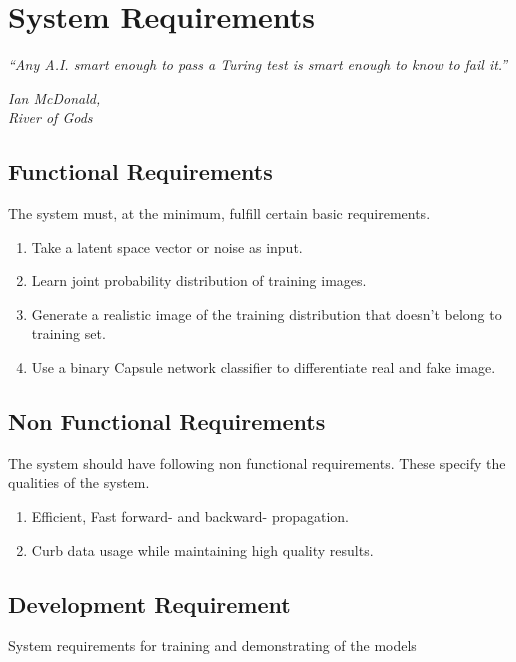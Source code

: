\chapter{System Requirements}\label{ch:system_requirements}
\epigraph{\textit{\normalsize “Any A.I. smart enough to pass a Turing test is smart enough to know to fail it.”}}{\textit{ \normalsize Ian McDonald,\\ River of Gods}}

\section{Functional Requirements} %
\label{sec:functional_requirements}
The system must, at the minimum, fulfill certain basic requirements.
\begin{enumerate}
    \item Take a latent space vector or noise as input.
    \item Learn joint probability distribution of training images.
    \item Generate a realistic image of the training distribution that doesn't belong to training set.
    \item Use a binary Capsule network classifier to differentiate real and fake image.
\end{enumerate}
\section{Non Functional Requirements} %
\label{sec:non_functional_requirements}
The system should have following non functional requirements. These specify the qualities of the system.
\begin{enumerate}
    \item Efficient, Fast forward- and backward- propagation.
    \item Curb data usage while maintaining high quality results.    
\end{enumerate}

\section{Development Requirement} %
\label{sec:development_requirement}
\noindent
System requirements for training and demonstrating of the models
